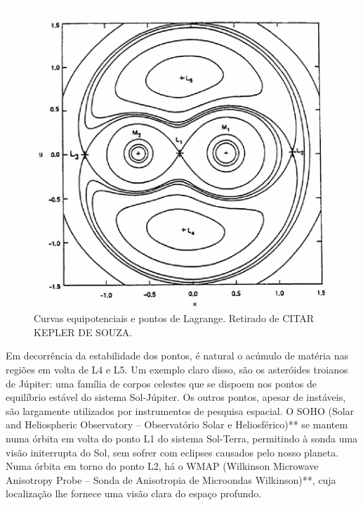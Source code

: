 \begin{figure}[!h]
\centering
\includegraphics{PL.gif}
\caption{Curvas equipotenciais e pontos de Lagrange. Retirado de CITAR KEPLER DE SOUZA.}
\end{figure}
   
Em decorrência da estabilidade dos pontos, é natural o acúmulo de matéria nas regiões em volta de L4 e L5. Um exemplo claro disso, são os asteróides troianos de Júpiter: uma família de corpos celestes que se dispoem nos pontos de equilíbrio estável do sistema Sol-Júpiter. Os outros pontos, apesar de instáveis, são largamente utilizados por instrumentos de pesquisa espacial. O SOHO (Solar and Heliospheric Observatory -- Observatório Solar e Heliosférico)** se mantem numa órbita em volta do ponto L1 do sistema Sol-Terra, permitindo à sonda uma visão initerrupta do Sol, sem sofrer com eclipses causados pelo nosso planeta. Numa órbita em torno do ponto L2, há o WMAP (Wilkinson Microwave Anisotropy Probe -- Sonda de Anisotropia de Microondas Wilkinson)**, cuja localização lhe fornece uma visão clara do espaço profundo.



